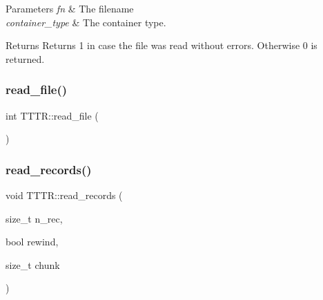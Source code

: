 \begin{DoxyParams}{Parameters}
{\em fn} & The filename \\
\hline
{\em container\+\_\+type} & The container type. \\
\hline
\end{DoxyParams}
\begin{DoxyReturn}{Returns}
Returns 1 in case the file was read without errors. Otherwise 0 is returned. 
\end{DoxyReturn}
\mbox{\label{class_t_t_t_r_a4a8f9c4d510819de9ec7a7151c10a05e}} 
\subsubsection{\texorpdfstring{read\+\_\+file()}{read\_file()}\hspace{0.1cm}{\footnotesize\ttfamily [2/2]}}
{\footnotesize\ttfamily int T\+T\+T\+R\+::read\+\_\+file (\begin{DoxyParamCaption}{ }\end{DoxyParamCaption})}

\mbox{\label{class_t_t_t_r_a8eb7661d2dc6180a0f69c07810705f4f}} 
\subsubsection{\texorpdfstring{read\+\_\+records()}{read\_records()}\hspace{0.1cm}{\footnotesize\ttfamily [1/3]}}
{\footnotesize\ttfamily void T\+T\+T\+R\+::read\+\_\+records (\begin{DoxyParamCaption}\item[{size\+\_\+t}]{n\+\_\+rec,  }\item[{bool}]{rewind,  }\item[{size\+\_\+t}]{chunk }\end{DoxyParamCaption})\hspace{0.3cm}{\ttfamily [protected]}}

